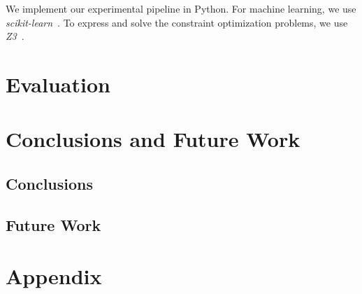 \documentclass{article}
\theoremstyle{definition}
\begin{document}
We implement our experimental pipeline in Python.
For machine learning, we use \emph{scikit-learn}~\cite{pedregosa2011scikit-learn}.
To express and solve the constraint optimization problems, we use \emph{Z3}~\cite{deMoura2008z3}.

\section{Evaluation}
\label{sec:evaluation}

\section{Conclusions and Future Work}
\label{sec:conclusion}

\subsection{Conclusions}

\subsection{Future Work}

\printbibliography

\appendix

\section{Appendix}
\label{sec:appendix}
\end{document}
